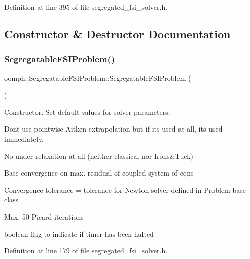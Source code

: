 Definition at line 395 of file segregated\+\_\+fsi\+\_\+solver.\+h.



\subsection{Constructor \& Destructor Documentation}
\mbox{\label{classoomph_1_1SegregatableFSIProblem_aabbe220c15e7a348a28d54be805ca8d8}} 
\subsubsection{\texorpdfstring{Segregatable\+F\+S\+I\+Problem()}{SegregatableFSIProblem()}}
{\footnotesize\ttfamily oomph\+::\+Segregatable\+F\+S\+I\+Problem\+::\+Segregatable\+F\+S\+I\+Problem (\begin{DoxyParamCaption}{ }\end{DoxyParamCaption})\hspace{0.3cm}{\ttfamily [inline]}}



Constructor. Set default values for solver parameters\+: 


\begin{DoxyItemize}
\item Don\textquotesingle{}t use pointwise Aitken extrapolation but if it\textquotesingle{}s used at all, it\textquotesingle{}s used immediately.
\item No under-\/relaxation at all (neither classical nor Irons\&Tuck)
\item Base convergence on max. residual of coupled system of eqns
\item Convergence tolerance = tolerance for Newton solver defined in Problem base class
\item Max. 50 Picard iterations 
\end{DoxyItemize}boolean flag to indicate if timer has been halted 

Definition at line 179 of file segregated\+\_\+fsi\+\_\+solver.\+h.

\mbox{\label{classoomph_1_1SegregatableFSIProblem_aa3c69a4078b02d251e4532e73d5820aa}} 
